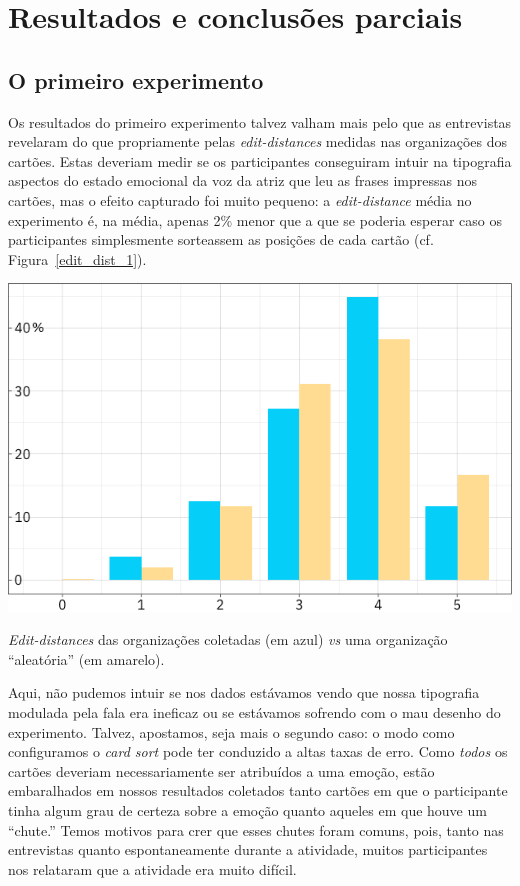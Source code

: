 \documentclass{tufte-handout}
\begin{document}
\section{Resultados e conclusões parciais}\label{sec:resultados}

\subsection{O primeiro experimento}

Os resultados do primeiro experimento talvez valham mais pelo que as entrevistas revelaram do que propriamente pelas \textit{edit-distances} medidas nas organizações dos cartões. Estas deveriam medir se os participantes conseguiram intuir na tipografia aspectos do estado emocional da voz da atriz que leu  as frases impressas nos cartões, mas o efeito capturado foi muito pequeno: a \textit{edit-distance} média no experimento é, na média, apenas 2\% menor que a que se poderia esperar caso os participantes simplesmente sorteassem as posições de cada cartão (cf. Figura~\ref{edit_dist_1}).

\begin{marginfigure}
  \includegraphics{imgs/edit_distance_reais.png}
  \caption{\textit{Edit-distances} das organizações coletadas (em azul) \textit{vs} uma organização ``aleatória'' (em amarelo).}
  \label{edit_dist_1}
\end{marginfigure}

Aqui, não pudemos intuir se nos dados estávamos vendo que nossa tipografia modulada pela fala era ineficaz ou se estávamos sofrendo com o mau desenho do experimento. Talvez, apostamos, seja mais o segundo caso: o modo como configuramos o \textit{card sort} pode ter conduzido a altas taxas de erro. Como \textit{todos} os cartões deveriam necessariamente ser atribuídos a uma emoção, estão embaralhados em nossos resultados coletados tanto cartões em que o participante tinha algum grau de certeza sobre a emoção quanto aqueles em que houve um ``chute.'' Temos motivos para crer que esses chutes foram comuns, pois, tanto nas entrevistas quanto espontaneamente durante a atividade, muitos participantes nos relataram que a atividade era muito difícil.
\end{document}
